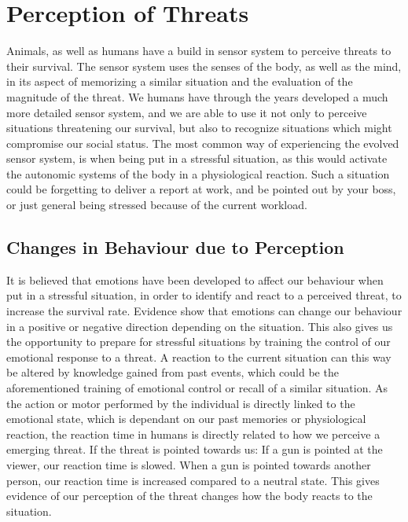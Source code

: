 \section{Perception of Threats} \label{perception}
Animals, as well as humans have a build in sensor system to perceive threats to their survival. The sensor system uses the senses of the body, as well as the mind, in its aspect of memorizing a similar situation and the evaluation of the magnitude of the threat. We humans have through the years developed a much more detailed sensor system, and we are able to use it not only to perceive situations threatening our survival, but also to recognize situations which might compromise our social status. The most common way of experiencing the evolved sensor system, is when being put in a stressful situation, as this would activate the autonomic systems of the body in a physiological reaction. Such a situation could be forgetting to deliver a report at work, and be pointed out by your boss, or just general being stressed because of the current workload.

\subsection{Changes in Behaviour due to Perception}
It is believed that emotions have been developed to affect our behaviour when put in a stressful situation, in order to identify and react to a perceived threat, to increase the survival rate. Evidence show that emotions can change our behaviour in a positive or negative direction depending on the situation. This also gives us the opportunity to prepare for stressful situations by training the control of our emotional response to a threat. A reaction to the current situation can this way be altered by knowledge gained from past events, which could be the aforementioned training of emotional control or recall of a similar situation. As the action or motor performed by the individual is directly linked to the emotional state, which is dependant on our past memories or physiological reaction, the reaction time in humans is directly related to how we perceive a emerging threat. If the threat is pointed towards us: If a gun is pointed at the viewer, our reaction time is slowed. When a gun is pointed towards another person, our reaction time is increased compared to a neutral state. This gives evidence of our perception of the threat changes how the body reacts to the situation. 
\cite{threat_behaviour}

